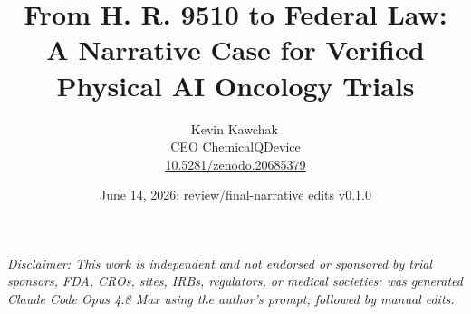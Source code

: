 \documentclass[11pt]{article}
\title{From H. R. 9510 to Federal Law:\\A Narrative Case for Verified Physical AI Oncology Trials}
\author{Kevin Kawchak\,\orcidicon{0009-0007-5457-8667}\\ CEO ChemicalQDevice\\ \href{https://doi.org/10.5281/zenodo.20685379}{10.5281/zenodo.20685379}}
\date{June 14, 2026: review/final-narrative edits v0.1.0}
\begin{document}
\maketitle
\thispagestyle{empty}

\begin{abstract}

\end{abstract}

\vspace{0.2em}\noindent\footnotesize\textit{Disclaimer: This work is independent
and not endorsed or sponsored by trial sponsors, FDA, CROs, sites, IRBs,
regulators, or medical societies; was generated Claude Code Opus 4.8 Max using the author's prompt; followed by manual edits.}\normalsize\par




\tableofcontents
\vspace{0.3cm}










\clearpage


\clearpage
{}
\begingroup\raggedright\nocite{*}\endgroup


\end{document}
